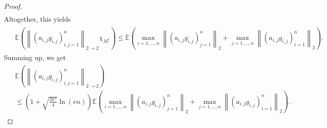 \documentclass[12pt,a4paper]{article}
\newcommand{\Ex}{\mathbb{E}}
\newcommand{\norm}[1]{\left \lVert#1 \right\rVert}
\begin{document}
\begin{proof}
\begin{eqnarray*}
\end{eqnarray*}
Altogether, this yields
	\begin{eqnarray*}
		\left.\begin{split}
	     & \Ex\left(\norm{(a_{i,j}g_{i,j})_{i,j=1}^n}_{2\rightarrow 2}\chi_{M^{c}}\right)
	     \leq \Ex\left(\max\limits_{i=1,...,n}\norm{(a_{i,j}g_{i,j})_{j=1}^n}_2+\max\limits_{j=1,...,n}\norm{(a_{i,j}g_{i,j})_{i=1}^n}_2\right).
		\end{split}\right.
	\end{eqnarray*}
Summing up, we get
\begin{eqnarray*}
\left.\begin{split}
& \Ex\left(\norm{(a_{i,j}g_{i,j})_{i,j=1}^n}_{2\rightarrow 2}\right)\\
&\leq
\left(1+\sqrt{\frac{3\pi^{3}}{4}}\ln(en)\right)
\Ex\left(\max\limits_{i=1,...,n}\norm{(a_{i,j}g_{i,j})_{j=1}^n}_2+
\max\limits_{j=1,...,n}\norm{(a_{i,j}g_{i,j})_{i=1}^n}_2\right).
\end{split}\right.
\end{eqnarray*}
\end{proof}
\vskip 3mm
\end{document}
